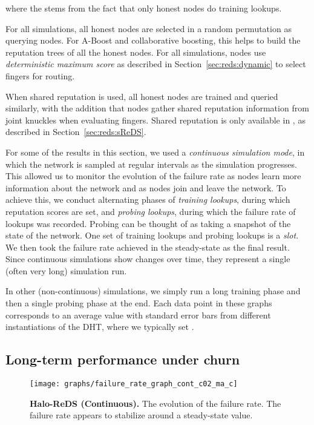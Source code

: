 where the  stems from the fact that only honest nodes do training
lookups.



 For all simulations, all honest
nodes are selected in a random permutation as querying nodes. For A-Boost
and collaborative boosting, this helps to build the reputation trees of
all the honest nodes. For all \sys simulations, nodes use
\emph{deterministic maximum score} as described in
Section~\ref{sec:reds:dynamic} to select fingers for routing.

 When shared reputation is used, all
honest nodes are trained and queried similarly, with the addition that
nodes gather shared reputation information from joint knuckles when
evaluating fingers. Shared reputation is only available in \hsys, as
described in Section~\ref{sec:reds:sReDS}.


  For some of the results in this section, we used
a {\em continuous simulation mode}, in which the network is sampled at
regular intervals as the simulation progresses. This allowed us to
monitor the evolution of the failure rate as nodes learn more
information about the network and as nodes join and leave the
network. To achieve this, we conduct alternating phases of  {\em
  training lookups}, during which reputation scores are set, and 
{\em probing lookups}, during which the failure rate of lookups was
recorded. Probing can be thought of as taking a snapshot of the state of
the network. One set of training lookups and probing lookups is a
\emph{slot}.
We then took the failure rate achieved in the steady-state as the final
result. Since continuous simulations show changes over time, they
represent a single (often very long) simulation run.

In other (non-continuous) simulations, we simply run a long training
phase and then a single probing phase at the end. Each data point in
these graphs corresponds to an average value with standard error bars
from  different instantiations of the DHT, where we typically set
.





\subsection{Long-term performance under churn}
\label{sec:eval-churn}

\begin{figure}[t]
\centering
\texttt{[image: graphs/failure\_rate\_graph\_cont\_c02\_ma\_c]}
\caption{{\bf Halo-ReDS (Continuous).} The evolution of the failure
   rate. The failure rate appears to stabilize around a steady-state
   value.}    \label{fig:churn_c02}
\end{figure}

